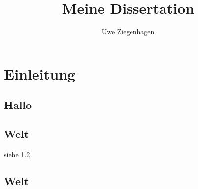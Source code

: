 \documentclass[12pt,ngerman]{scrbook}
\title{Meine Dissertation}
\author{Uwe Ziegenhagen}
\begin{document}
\maketitle

\tableofcontents

\listoffigures

\listoftables

\chapter{Einleitung}
\section{Hallo}\label{sec:hallo}

\blindtext[20]


\section{Welt}\label{sec:hallo}


siehe \ref{sec:hallo}


\blindtext[10]


\section{Welt}

\blindtext[10]
\end{document}
